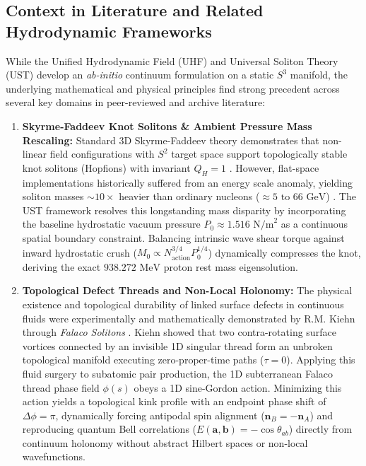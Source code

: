 \documentclass[11pt,a4paper]{article}
\begin{document}
	\subsection{Context in Literature and Related Hydrodynamic Frameworks}
	While the Unified Hydrodynamic Field (UHF) and Universal Soliton Theory (UST) develop an \textit{ab-initio} continuum formulation on a static $S^3$ manifold, the underlying mathematical and physical principles find strong precedent across several key domains in peer-reviewed and archive literature:
	
	\begin{enumerate}
		\item \textbf{Skyrme-Faddeev Knot Solitons \& Ambient Pressure Mass Rescaling:} 
		Standard 3D Skyrme-Faddeev theory demonstrates that non-linear field configurations with $S^2$ target space support topologically stable knot solitons (Hopfions) with invariant $Q_H = 1$ \cite{faddeev_niemi_1997, hietarinta_2000}. However, flat-space implementations historically suffered from an energy scale anomaly, yielding soliton masses $\sim 10\times$ heavier than ordinary nucleons ($\approx 5 \text{ to } 66\text{ GeV}$) \cite{hietarinta_2000}. The UST framework resolves this longstanding mass disparity by incorporating the baseline hydrostatic vacuum pressure $P_0 \approx 1.516\text{ N/m}^2$ as a continuous spatial boundary constraint. Balancing intrinsic wave shear torque against inward hydrostatic crush ($M_0 \propto N_{\text{action}}^{3/4} P_0^{1/4}$) dynamically compresses the knot, deriving the exact $938.272\text{ MeV}$ proton rest mass eigensolution.
		
		\item \textbf{Topological Defect Threads and Non-Local Holonomy:}
		The physical existence and topological durability of linked surface defects in continuous fluids were experimentally and mathematically demonstrated by R.M. Kiehn through \textit{Falaco Solitons} \cite{kiehn_falaco_2001}. Kiehn showed that two contra-rotating surface vortices connected by an invisible 1D singular thread form an unbroken topological manifold executing zero-proper-time paths ($\tau = 0$). Applying this fluid surgery to subatomic pair production, the 1D subterranean Falaco thread phase field $\phi(s)$ obeys a 1D sine-Gordon action. Minimizing this action yields a topological kink profile with an endpoint phase shift of $\Delta \phi = \pi$, dynamically forcing antipodal spin alignment ($\mathbf{n}_B = -\mathbf{n}_A$) and reproducing quantum Bell correlations ($E(\mathbf{a},\mathbf{b}) = -\cos\theta_{ab}$) directly from continuum holonomy without abstract Hilbert spaces or non-local wavefunctions.
		

\end{enumerate}
\end{document}
